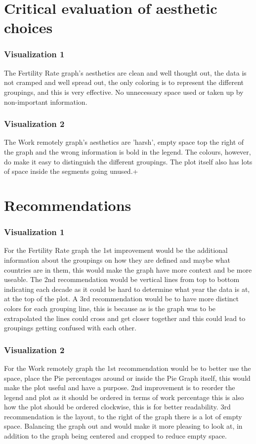 \documentclass{article}
\begin{document}
\section{Critical evaluation of aesthetic choices}
\subsubsection{Visualization 1}
The Fertility Rate graph’s aesthetics are clean and well thought out, the data is not cramped and well spread out, the only coloring is to represent the different groupings, and this is very effective. No unnecessary space used or taken up by non-important information. 

\subsubsection{Visualization 2}
The Work remotely graph’s aesthetics are 'harsh', empty space top the right of the graph and the wrong information is bold in the legend. The colours, however, do make it easy to distinguish the different groupings. The plot itself also has lots of space inside the segments going unused.+


\section{Recommendations}
\subsubsection{Visualization 1}
For the Fertility Rate graph the 1st improvement would be the additional information about the groupings on how they are defined and maybe what countries are in them, this would make the graph have more context and be more useable. The 2nd recommendation would be vertical lines from top to bottom indicating each decade as it could be hard to determine what year the data is at, at the top of the plot. A 3rd recommendation would be to have more distinct colors for each grouping line, this is because as is the graph was to be extrapolated the lines could cross and get closer together and this could lead to groupings getting confused with each other. 

\subsubsection{Visualization 2}
For the Work remotely graph the 1st recommendation would be to better use the space, place the Pie percentages around or inside the Pie Graph itself, this would make the plot useful and have a purpose. 2nd improvement is to reorder the legend and plot as it should be ordered in terms of work percentage this is also how the plot should be ordered clockwise, this is for better readability. 3rd recommendation is the layout, to the right of the graph there is a lot of empty space. Balancing the graph out and would make it more pleasing to look at, in addition to the graph being centered and cropped to reduce empty space. 
\end{document}
